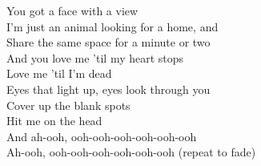 You got a face with a view\\
I'm just an animal looking for a home, and\\
Share the same space for a minute or two\\
And you love me 'til my heart stops\\
Love me 'til I'm dead\\
Eyes that light up, eyes look through you\\
Cover up the blank spots\\
Hit me on the head\\
And ah-ooh, ooh-ooh-ooh-ooh-ooh-ooh\\
Ah-ooh, ooh-ooh-ooh-ooh-ooh-ooh (repeat to fade)\\
